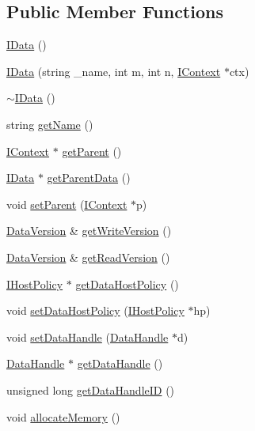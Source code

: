 \subsection*{Public Member Functions}
\begin{DoxyCompactItemize}
\item 
\hyperlink{class_i_data_a75fd2d8c81d6a34679ebc3222d8339a2}{IData} ()
\item 
\hyperlink{class_i_data_a7f41e876d5c6c19e5b77ca480b3978b3}{IData} (string \_\-name, int m, int n, \hyperlink{class_i_context}{IContext} $\ast$ctx)
\item 
\hyperlink{class_i_data_a30ce868ac52a0fc576606b9c98da125f}{$\sim$IData} ()
\item 
string \hyperlink{class_i_data_a87b7baa5c42fd4c2b36875141030880d}{getName} ()
\item 
\hyperlink{class_i_context}{IContext} $\ast$ \hyperlink{class_i_data_af014d3691bd00c551cf4a36371ef80ec}{getParent} ()
\item 
\hyperlink{class_i_data}{IData} $\ast$ \hyperlink{class_i_data_a44b0310e7c4e7ddd9a9656f857b7d382}{getParentData} ()
\item 
void \hyperlink{class_i_data_a4442a7d48bf3e6653216f8eada3f26a2}{setParent} (\hyperlink{class_i_context}{IContext} $\ast$p)
\item 
\hyperlink{struct_data_version}{DataVersion} \& \hyperlink{class_i_data_a60fc8394c65d93631d9c321b505f37d7}{getWriteVersion} ()
\item 
\hyperlink{struct_data_version}{DataVersion} \& \hyperlink{class_i_data_a0c16a5178f9f66eb3df346b82fbd9608}{getReadVersion} ()
\item 
\hyperlink{class_i_host_policy}{IHostPolicy} $\ast$ \hyperlink{class_i_data_a9b586d8ceb8ebb508165851dae75cad2}{getDataHostPolicy} ()
\item 
void \hyperlink{class_i_data_ae65b99c98bd1dcb8c86dd2f8d2a4f9dd}{setDataHostPolicy} (\hyperlink{class_i_host_policy}{IHostPolicy} $\ast$hp)
\item 
void \hyperlink{class_i_data_a7e8587fe8eee5211a393f20752712bbc}{setDataHandle} (\hyperlink{struct_data_handle}{DataHandle} $\ast$d)
\item 
\hyperlink{struct_data_handle}{DataHandle} $\ast$ \hyperlink{class_i_data_a07c124c61dac722dded4c78d45be5cd2}{getDataHandle} ()
\item 
unsigned long \hyperlink{class_i_data_af0448989fa9d551acfb8ead2523a32e5}{getDataHandleID} ()
\item 
void \hyperlink{class_i_data_aa3f5c7ae906943db0780856ba3d53a33}{allocateMemory} ()

\end{DoxyCompactItemize}
